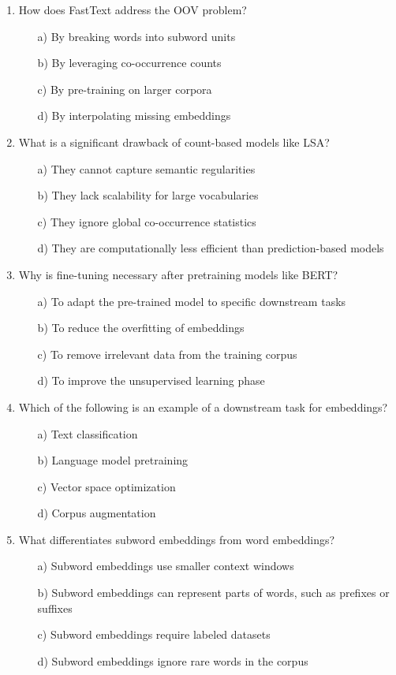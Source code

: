 \documentclass[8pt]{extarticle}
\begin{document}
\begin{multicols}{2}
\begin{enumerate}
\item How does FastText address the OOV problem?
\begin{itemize}
\item[a)] By breaking words into subword units
\item[b)] By leveraging co-occurrence counts
\item[c)] By pre-training on larger corpora
\item[d)] By interpolating missing embeddings
\end{itemize}

\item What is a significant drawback of count-based models like LSA?
\begin{itemize}
\item[a)] They cannot capture semantic regularities
\item[b)] They lack scalability for large vocabularies
\item[c)] They ignore global co-occurrence statistics
\item[d)] They are computationally less efficient than prediction-based models
\end{itemize}

\item Why is fine-tuning necessary after pretraining models like BERT?
\begin{itemize}
\item[a)] To adapt the pre-trained model to specific downstream tasks
\item[b)] To reduce the overfitting of embeddings
\item[c)] To remove irrelevant data from the training corpus
\item[d)] To improve the unsupervised learning phase
\end{itemize}

\item Which of the following is an example of a downstream task for embeddings?
\begin{itemize}
\item[a)] Text classification
\item[b)] Language model pretraining
\item[c)] Vector space optimization
\item[d)] Corpus augmentation
\end{itemize}

\item What differentiates subword embeddings from word embeddings?
\begin{itemize}
\item[a)] Subword embeddings use smaller context windows
\item[b)] Subword embeddings can represent parts of words, such as prefixes or suffixes
\item[c)] Subword embeddings require labeled datasets
\item[d)] Subword embeddings ignore rare words in the corpus
\end{itemize}


\end{enumerate}
\end{multicols}
\end{document}
